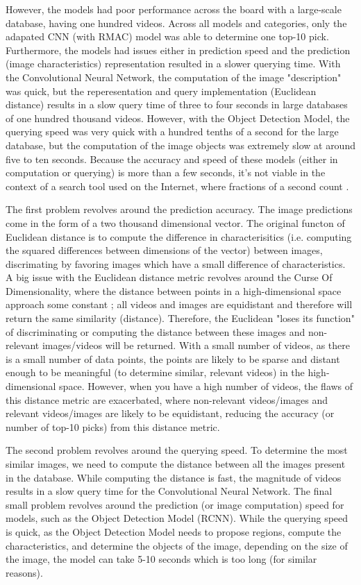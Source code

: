 \documentclass[10pt,twocolumn]{article}
\begin{document}
However, the models had poor performance across the board with a large-scale database, having one hundred videos. Across all models and categories, only the adapated CNN (with RMAC) model was able to determine one top-10 pick. Furthermore, the models had issues either in prediction speed and the prediction (image characteristics) representation resulted in a slower querying time. With the Convolutional Neural Network, the computation of the image "description" was quick, but the reperesentation and query implementation (Euclidean distance) results in a slow query time of three to four seconds in large databases of one hundred thousand videos. However, with the Object Detection Model, the querying speed was very quick with a hundred tenths of a second for the large database, but the computation of the image objects was extremely slow at around five to ten seconds. Because the accuracy and speed of these models (either in computation or querying) is more than a few seconds, it's not viable in the context of a search tool used on the Internet, where fractions of a second count \cite{GOOGLE TODO}.

The first problem revolves around the prediction accuracy. The image predictions come in the form of a two thousand dimensional vector. The original functon of Euclidean distance is to compute the difference in characterisitics (i.e. computing the squared differences between dimensions of the vector) between images, discrimating by favoring images which have a small difference of characteristics. A big issue with the Euclidean distance metric revolves around the Curse Of Dimensionality, where the distance between points in a high-dimensional space approach some constant \cite{WIKIPEDIA TODO}; all videos and images are equidistant and therefore will return the same similarity (distance). Therefore, the Euclidean "loses its function" \cite{WIKIPEDIA TODO} of discriminating or computing the distance between these images and non-relevant images/videos will be returned. With a small number of videos, as there is a small number of data points, the points are likely to be sparse and distant enough to be meaningful (to determine similar, relevant videos) in the high-dimensional space. However, when you have a high number of videos, the flaws of this distance metric are exacerbated, where non-relevant videos/images and relevant videos/images are likely to be equidistant, reducing the accuracy (or number of top-10 picks) from this distance metric.

The second problem revolves around the querying speed. To determine the most similar images, we need to compute the distance between all the images present in the database. While computing the distance is fast, the magnitude of videos results in a slow query time for the Convolutional Neural Network. The final small problem revolves around the prediction (or image computation) speed for models, such as the Object Detection Model (RCNN). While the querying speed is quick, as the Object Detection Model needs to propose regions, compute the characteristics, and determine the objects of the image, depending on the size of the image, the model can take 5-10 seconds which is too long (for similar reasons).
\end{document}
